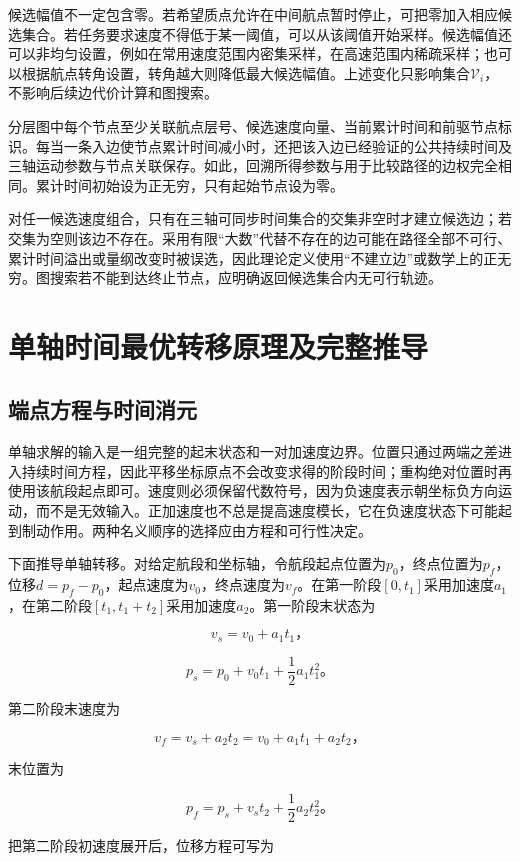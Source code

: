 \documentclass[UTF8,a4paper,12pt,fontset=fandol]{ctexart}
\begin{document}
候选幅值不一定包含零。若希望质点允许在中间航点暂时停止，可把零加入相应候选集合。若任务要求速度不得低于某一阈值，可以从该阈值开始采样。候选幅值还可以非均匀设置，例如在常用速度范围内密集采样，在高速范围内稀疏采样；也可以根据航点转角设置，转角越大则降低最大候选幅值。上述变化只影响集合\(\mathcal V_i\)，不影响后续边代价计算和图搜索。

分层图中每个节点至少关联航点层号、候选速度向量、当前累计时间和前驱节点标识。每当一条入边使节点累计时间减小时，还把该入边已经验证的公共持续时间及三轴运动参数与节点关联保存。如此，回溯所得参数与用于比较路径的边权完全相同。累计时间初始设为正无穷，只有起始节点设为零。

对任一候选速度组合，只有在三轴可同步时间集合的交集非空时才建立候选边；若交集为空则该边不存在。采用有限“大数”代替不存在的边可能在路径全部不可行、累计时间溢出或量纲改变时被误选，因此理论定义使用“不建立边”或数学上的正无穷。图搜索若不能到达终止节点，应明确返回候选集合内无可行轨迹。

\section{单轴时间最优转移原理及完整推导}

\subsection{端点方程与时间消元}

单轴求解的输入是一组完整的起末状态和一对加速度边界。位置只通过两端之差进入持续时间方程，因此平移坐标原点不会改变求得的阶段时间；重构绝对位置时再使用该航段起点即可。速度则必须保留代数符号，因为负速度表示朝坐标负方向运动，而不是无效输入。正加速度也不总是提高速度模长，它在负速度状态下可能起到制动作用。两种名义顺序的选择应由方程和可行性决定。

下面推导单轴转移。对给定航段和坐标轴，令航段起点位置为\(p_0\)，终点位置为\(p_f\)，位移\(d=p_f-p_0\)，起点速度为\(v_0\)，终点速度为\(v_f\)。在第一阶段\([0,t_1]\)采用加速度\(a_1\)，在第二阶段\([t_1,t_1+t_2]\)采用加速度\(a_2\)。第一阶段末状态为

\[
v_s=v_0+a_1t_1\text{，}
\]

\[
p_s=p_0+v_0t_1+\frac12a_1t_1^2\text{。}
\]

第二阶段末速度为

\[
v_f=v_s+a_2t_2=v_0+a_1t_1+a_2t_2\text{，}
\]

末位置为

\[
p_f=p_s+v_st_2+\frac12a_2t_2^2\text{。}
\]

把第二阶段初速度展开后，位移方程可写为
\end{document}
